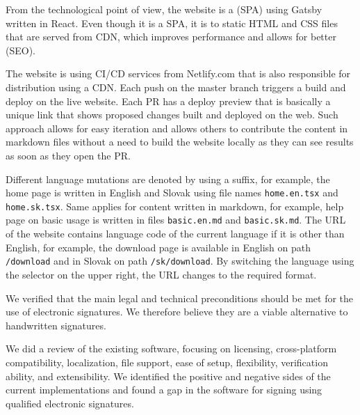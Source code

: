 \documentclass[thesismargins, english, thesislinespacing, onelinechapterstyle, upjsfrontpage]{rnthesis}
\begin{document}
From the technological point of view, the website is a  (SPA) using Gatsby written in React.
Even though it is a SPA, it is  to static HTML and CSS files that are served from CDN, which improves performance and allows for better  (SEO).

The website is using CI/CD services from Netlify.com that is also responsible for distribution using a CDN.
Each push on the master branch triggers a build and deploy on the live website.
Each PR has a deploy preview that is basically a unique link that shows proposed changes built and deployed on the web.
Such approach allows for easy iteration and allows others to contribute the content in markdown files without a need to build the website locally as they can see results as soon as they open the PR.

Different language mutations are denoted by using a suffix, for example, the home page is written in English and Slovak using file names \texttt{home.en.tsx} and \texttt{home.sk.tsx}.
Same applies for content written in markdown, for example, help page on basic usage is written in files \texttt{basic.en.md} and \texttt{basic.sk.md}.
The URL of the website contains language code of the current language if it is other than English, for example, the download page is available in English on path \texttt{/download} and in Slovak on path \texttt{/sk/download}.
By switching the language using the selector on the upper right, the URL changes to the required format.

\zaver

We verified that the main legal and technical preconditions should be met for the use of electronic signatures.
We therefore believe they are a viable alternative to handwritten signatures.

We did a review of the existing software, focusing on licensing, cross-platform compatibility, localization, file support, ease of setup, flexibility, verification ability, and extensibility.
We identified the positive and negative sides of the current implementations and found a gap in the software for signing using qualified electronic signatures.
\end{document}
